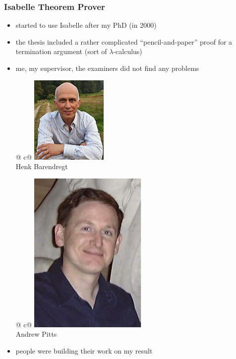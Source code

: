 \documentclass[dvipsnames,14pt,t]{beamer}
\begin{document}
\begin{frame}[c]
\frametitle{\Large Isabelle Theorem Prover}

\begin{itemize}
\item started to use Isabelle after my PhD (in 2000)

\item the thesis included a rather complicated 
  ``pencil-and-paper'' proof for a 
  termination argument (sort of $\lambda$-calculus)\medskip
 
\item me, my supervisor, the examiners did not find any problems\medskip 
 \begin{center}
  \begin{tabular}{@ {}c@ {}}
  \includegraphics[scale=0.38]{pics/barendregt.jpg}\\[-2mm]
  \footnotesize Henk Barendregt
  \end{tabular}
  \hspace{2mm}
  \begin{tabular}{@ {}c@ {}}
  \includegraphics[scale=0.20]{pics/andrewpitts.jpg}\\[-2mm]
  \footnotesize Andrew Pitts
  \end{tabular}
  \end{center}
  
\item people were building their work on my result      
  
\end{itemize}

\end{frame}
\end{document}
